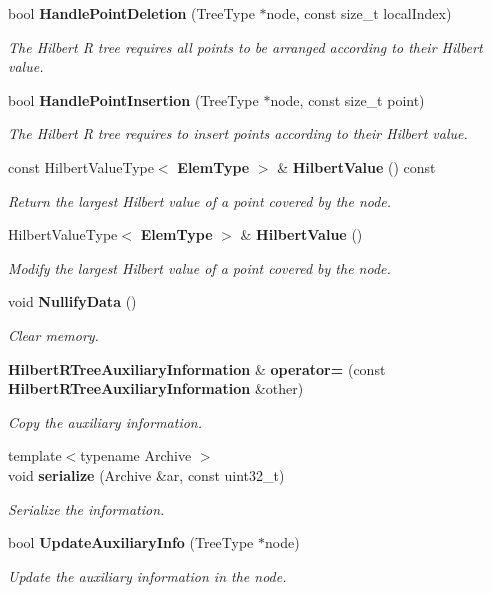 \begin{DoxyCompactItemize}
bool \textbf{ Handle\+Point\+Deletion} (Tree\+Type $\ast$node, const size\+\_\+t local\+Index)
\begin{DoxyCompactList}\small\item\em The Hilbert R tree requires all points to be arranged according to their Hilbert value. \end{DoxyCompactList}\item 
bool \textbf{ Handle\+Point\+Insertion} (Tree\+Type $\ast$node, const size\+\_\+t point)
\begin{DoxyCompactList}\small\item\em The Hilbert R tree requires to insert points according to their Hilbert value. \end{DoxyCompactList}\item 
const Hilbert\+Value\+Type$<$ \textbf{ Elem\+Type} $>$ \& \textbf{ Hilbert\+Value} () const
\begin{DoxyCompactList}\small\item\em Return the largest Hilbert value of a point covered by the node. \end{DoxyCompactList}\item 
Hilbert\+Value\+Type$<$ \textbf{ Elem\+Type} $>$ \& \textbf{ Hilbert\+Value} ()
\begin{DoxyCompactList}\small\item\em Modify the largest Hilbert value of a point covered by the node. \end{DoxyCompactList}\item 
void \textbf{ Nullify\+Data} ()
\begin{DoxyCompactList}\small\item\em Clear memory. \end{DoxyCompactList}\item 
\textbf{ Hilbert\+R\+Tree\+Auxiliary\+Information} \& \textbf{ operator=} (const \textbf{ Hilbert\+R\+Tree\+Auxiliary\+Information} \&other)
\begin{DoxyCompactList}\small\item\em Copy the auxiliary information. \end{DoxyCompactList}\item 
{\footnotesize template$<$typename Archive $>$ }\\void \textbf{ serialize} (Archive \&ar, const uint32\+\_\+t)
\begin{DoxyCompactList}\small\item\em Serialize the information. \end{DoxyCompactList}\item 
bool \textbf{ Update\+Auxiliary\+Info} (Tree\+Type $\ast$node)
\begin{DoxyCompactList}\small\item\em Update the auxiliary information in the node. \end{DoxyCompactList}\end{DoxyCompactItemize}
